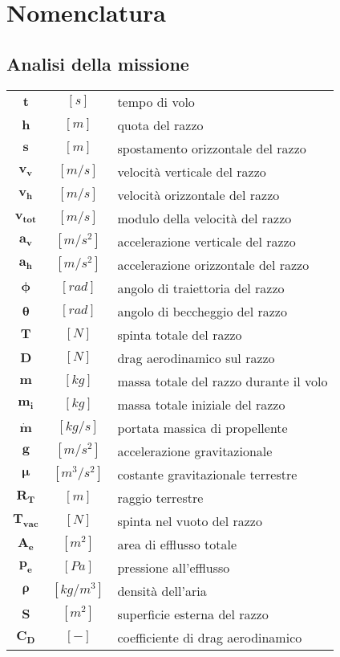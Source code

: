 \section{Nomenclatura}
\label{sec:nomenclatura}
\setcounter{subsection}{1}

\begin{multicols}{2}

	\subsection{Analisi della missione}
	\small
	\begin{tabular}{ccl}
		$\bm{t}$ & $[s]$ & tempo di volo \\
		$\bm{h}$ & $[m]$ & quota del razzo \\
		$\bm{s}$ & $[m]$ & spostamento orizzontale del razzo \\
		$\bm{v_v}$ & $[m/s]$ & velocità verticale del razzo \\
		$\bm{v_h}$ & $[m/s]$ & velocità orizzontale del razzo \\
		$\bm{v_{tot}}$ & $[m/s]$ & modulo della velocità del razzo \\
		$\bm{a_v}$ & $[m/s^2]$ & accelerazione verticale del razzo \\
		$\bm{a_h}$ & $[m/s^2]$ & accelerazione orizzontale del razzo \\
		$\bm{\phi}$ & $[rad]$ & angolo di traiettoria del razzo \\
		$\bm{\theta}$ & $[rad]$ & angolo di beccheggio del razzo \\
		$\bm{T}$ & $[N]$ & spinta totale del razzo \\
		$\bm{D}$ & $[N]$ & drag aerodinamico sul razzo \\
		$\bm{m}$ & $[kg]$ & massa totale del razzo durante il volo \\
		$\bm{m_i}$ & $[kg]$ & massa totale iniziale del razzo \\
		$\bm{\dot{m}}$ & $[kg/s]$ & portata massica di propellente \\
		$\bm{g}$ & $[m/s^2]$ & accelerazione gravitazionale \\
		$\bm{\mu}$ & $[m^3/s^2]$ & costante gravitazionale terrestre \\
		$\bm{R_T}$ & $[m]$ & raggio terrestre \\
		$\bm{T_{vac}}$ & $[N]$ & spinta nel vuoto del razzo \\
		$\bm{A_e}$ & $[m^2]$ & area di efflusso totale \\
		$\bm{p_e}$ & $[Pa]$ & pressione all'efflusso \\
		$\bm{\rho}$ & $[kg/m^3]$ & densità dell'aria \\
		$\bm{S}$ & $[m^2]$ & superficie esterna del razzo \\
		$\bm{C_D}$ & $[-]$ & coefficiente di drag aerodinamico
	\end{tabular}


\end{multicols}
